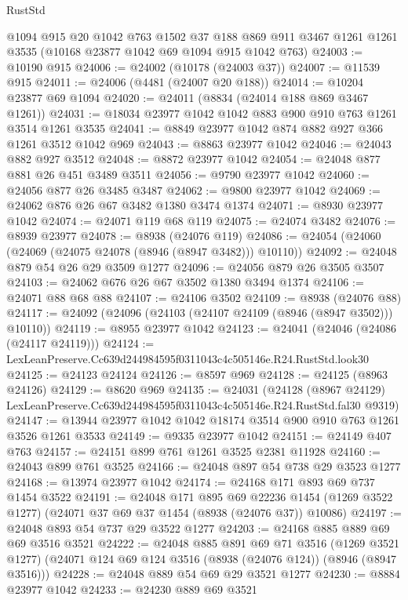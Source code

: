 \begin{lexlean}{RustStd}
\begin{coremodule}
    @1094
    @915
    @20
    @1042
    @763
    @1502
    @37
    @188
    @869
    @911
    @3467
    @1261
    @1261
    @3535
    (@10168 @23877 @1042 @69 @1094 @915 @1042 @763)
@24003 := @10190 @915
@24006 := @24002 (@10178 (@24003 @37))
@24007 := @11539 @915
@24011 := @24006 (@4481 (@24007 @20 @188))
@24014 := @10204 @23877 @69 @1094
@24020 := @24011 (@8834 (@24014 @188 @869 @3467 @1261))
@24031 := @18034 @23977 @1042 @1042 @883 @900 @910 @763 @1261 @3514 @1261 @3535
@24041 := @8849 @23977 @1042 @874 @882 @927 @366 @1261 @3512 @1042 @969
@24043 := @8863 @23977 @1042
@24046 := @24043 @882 @927 @3512
@24048 := @8872 @23977 @1042
@24054 := @24048 @877 @881 @26 @451 @3489 @3511
@24056 := @9790 @23977 @1042
@24060 := @24056 @877 @26 @3485 @3487
@24062 := @9800 @23977 @1042
@24069 := @24062 @876 @26 @67 @3482 @1380 @3474 @1374
@24071 := @8930 @23977 @1042
@24074 := @24071 @119 @68 @119
@24075 := @24074 @3482
@24076 := @8939 @23977
@24078 := @8938 (@24076 @119)
@24086 := @24054 (@24060 (@24069 (@24075 @24078 (@8946 (@8947 @3482))) @10110))
@24092 := @24048 @879 @54 @26 @29 @3509 @1277
@24096 := @24056 @879 @26 @3505 @3507
@24103 := @24062 @676 @26 @67 @3502 @1380 @3494 @1374
@24106 := @24071 @88 @68 @88
@24107 := @24106 @3502
@24109 := @8938 (@24076 @88)
@24117 := @24092 (@24096 (@24103 (@24107 @24109 (@8946 (@8947 @3502))) @10110))
@24119 := @8955 @23977 @1042
@24123 := @24041 (@24046 (@24086 (@24117 @24119)))
@24124 := LexLeanPreserve.Cc639d244984595f0311043c4c505146e.R24.RustStd.look30
@24125 := @24123 @24124
@24126 := @8597 @969
@24128 := @24125 (@8963 @24126)
@24129 := @8620 @969
@24135 := @24031
    (@24128
      (@8967 @24129)
      LexLeanPreserve.Cc639d244984595f0311043c4c505146e.R24.RustStd.fal30
      @9319)
@24147 := @13944 @23977 @1042 @1042 @18174 @3514 @900 @910 @763 @1261 @3526 @1261 @3533
@24149 := @9335 @23977 @1042
@24151 := @24149 @407 @763
@24157 := @24151 @899 @761 @1261 @3525 @2381 @11928
@24160 := @24043 @899 @761 @3525
@24166 := @24048 @897 @54 @738 @29 @3523 @1277
@24168 := @13974 @23977 @1042
@24174 := @24168 @171 @893 @69 @737 @1454 @3522
@24191 := @24048
    @171
    @895
    @69
    @22236
    @1454
    (@1269 @3522 @1277)
    (@24071 @37 @69 @37 @1454 (@8938 (@24076 @37)) @10086)
@24197 := @24048 @893 @54 @737 @29 @3522 @1277
@24203 := @24168 @885 @889 @69 @69 @3516 @3521
@24222 := @24048
    @885
    @891
    @69
    @71
    @3516
    (@1269 @3521 @1277)
    (@24071 @124 @69 @124 @3516 (@8938 (@24076 @124)) (@8946 (@8947 @3516)))
@24228 := @24048 @889 @54 @69 @29 @3521 @1277
@24230 := @8884 @23977 @1042
@24233 := @24230 @889 @69 @3521

\end{coremodule}
\end{lexlean}
